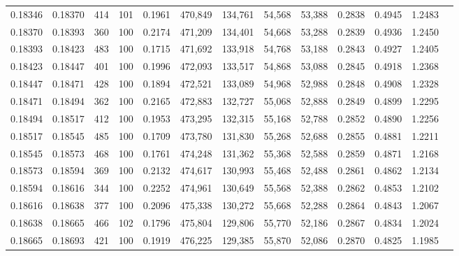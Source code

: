 \begin{tabular}{rrrrrrrrrrrrr}
0.18346 & 0.18370 &   414 & 101 &                                     0.1961 & 470,849 & 134,761 &  54,568 &  53,388 & 0.2838 & 0.4945 & 1.2483 \\
0.18370 & 0.18393 &   360 & 100 &                                     0.2174 & 471,209 & 134,401 &  54,668 &  53,288 & 0.2839 & 0.4936 & 1.2450 \\
0.18393 & 0.18423 &   483 & 100 &                                     0.1715 & 471,692 & 133,918 &  54,768 &  53,188 & 0.2843 & 0.4927 & 1.2405 \\
0.18423 & 0.18447 &   401 & 100 &                                     0.1996 & 472,093 & 133,517 &  54,868 &  53,088 & 0.2845 & 0.4918 & 1.2368 \\
0.18447 & 0.18471 &   428 & 100 &                                     0.1894 & 472,521 & 133,089 &  54,968 &  52,988 & 0.2848 & 0.4908 & 1.2328 \\
0.18471 & 0.18494 &   362 & 100 &                                     0.2165 & 472,883 & 132,727 &  55,068 &  52,888 & 0.2849 & 0.4899 & 1.2295 \\
0.18494 & 0.18517 &   412 & 100 &                                     0.1953 & 473,295 & 132,315 &  55,168 &  52,788 & 0.2852 & 0.4890 & 1.2256 \\
0.18517 & 0.18545 &   485 & 100 &                                     0.1709 & 473,780 & 131,830 &  55,268 &  52,688 & 0.2855 & 0.4881 & 1.2211 \\
0.18545 & 0.18573 &   468 & 100 &                                     0.1761 & 474,248 & 131,362 &  55,368 &  52,588 & 0.2859 & 0.4871 & 1.2168 \\
0.18573 & 0.18594 &   369 & 100 &                                     0.2132 & 474,617 & 130,993 &  55,468 &  52,488 & 0.2861 & 0.4862 & 1.2134 \\
0.18594 & 0.18616 &   344 & 100 &                                     0.2252 & 474,961 & 130,649 &  55,568 &  52,388 & 0.2862 & 0.4853 & 1.2102 \\
0.18616 & 0.18638 &   377 & 100 &                                     0.2096 & 475,338 & 130,272 &  55,668 &  52,288 & 0.2864 & 0.4843 & 1.2067 \\
0.18638 & 0.18665 &   466 & 102 &                                     0.1796 & 475,804 & 129,806 &  55,770 &  52,186 & 0.2867 & 0.4834 & 1.2024 \\
0.18665 & 0.18693 &   421 & 100 &                                     0.1919 & 476,225 & 129,385 &  55,870 &  52,086 & 0.2870 & 0.4825 & 1.1985 \\

\end{tabular}
